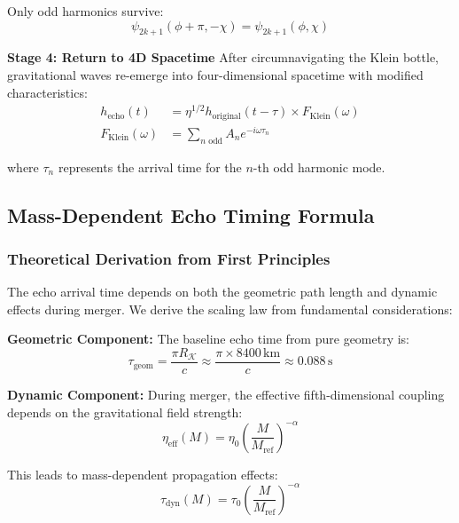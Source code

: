 \documentclass[reprint,amsmath,amssymb,aps,prd]{revtex4-2}
\newcommand{\Klein}{\mathcal{K}}
\newcommand{\KleinRadius}{R_\Klein}
\begin{document}
Only odd harmonics survive:
\begin{equation}
\psi_{2k+1}(\phi + \pi, -\chi) = \psi_{2k+1}(\phi, \chi)
\label{eq:odd_mode_preservation}
\end{equation}

\textbf{Stage 4: Return to 4D Spacetime}
After circumnavigating the Klein bottle, gravitational waves re-emerge into four-dimensional spacetime with modified characteristics:
\begin{align}
h_{\text{echo}}(t) &= \eta^{1/2} h_{\text{original}}(t - \tau) \times F_{\text{Klein}}(\omega) \label{eq:echo_waveform}\\
F_{\text{Klein}}(\omega) &= \sum_{n \text{ odd}} A_n e^{-i\omega \tau_n} \label{eq:klein_filter}
\end{align}

where $\tau_n$ represents the arrival time for the $n$-th odd harmonic mode.

\subsection{Mass-Dependent Echo Timing Formula}

\subsubsection{Theoretical Derivation from First Principles}

The echo arrival time depends on both the geometric path length and dynamic effects during merger. We derive the scaling law from fundamental considerations:

\textbf{Geometric Component:}
The baseline echo time from pure geometry is:
\begin{equation}
\tau_{\text{geom}} = \frac{\pi \KleinRadius}{c} \approx \frac{\pi \times 8400\,\text{km}}{c} \approx 0.088\,\text{s}
\label{eq:geometric_time}
\end{equation}

\textbf{Dynamic Component:}
During merger, the effective fifth-dimensional coupling depends on the gravitational field strength:
\begin{equation}
\eta_{\text{eff}}(M) = \eta_0 \left(\frac{M}{M_{\text{ref}}}\right)^{-\alpha}
\label{eq:dynamic_coupling}
\end{equation}

This leads to mass-dependent propagation effects:
\begin{equation}
\tau_{\text{dyn}}(M) = \tau_0 \left(\frac{M}{M_{\text{ref}}}\right)^{-\alpha}
\label{eq:dynamic_time}
\end{equation}
\end{document}
